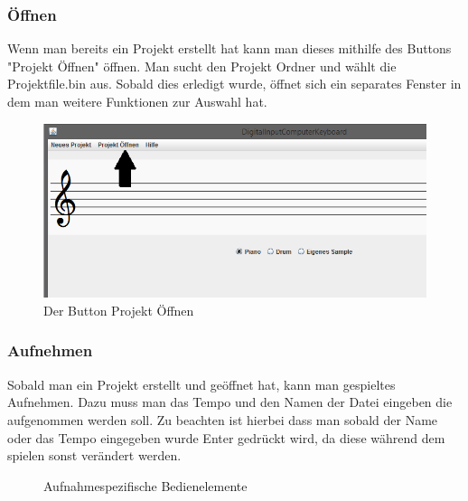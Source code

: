 \subsubsection{Öffnen}

Wenn man bereits ein Projekt erstellt hat kann man dieses mithilfe des Buttons "Projekt Öffnen" öffnen. Man sucht den Projekt Ordner und wählt die Projektfile.bin aus. Sobald dies erledigt wurde, öffnet sich ein separates Fenster in dem man weitere Funktionen zur Auswahl hat.

\begin{figure}[hbtp]
\centering
\includegraphics[scale=0.6]{Bilder/Projektbild3_1.PNG}
\caption{Der Button Projekt Öffnen}
\end{figure}

\newpage




\subsubsection{Aufnehmen}

Sobald man ein Projekt erstellt und geöffnet hat, kann man gespieltes Aufnehmen. Dazu muss man das Tempo und den Namen der Datei eingeben die aufgenommen werden soll. Zu beachten ist hierbei dass man sobald der Name oder das Tempo eingegeben wurde Enter gedrückt wird, da diese während dem spielen sonst verändert werden.

\begin{figure} 
\caption{Aufnahmespezifische Bedienelemente} 
\end{figure}

